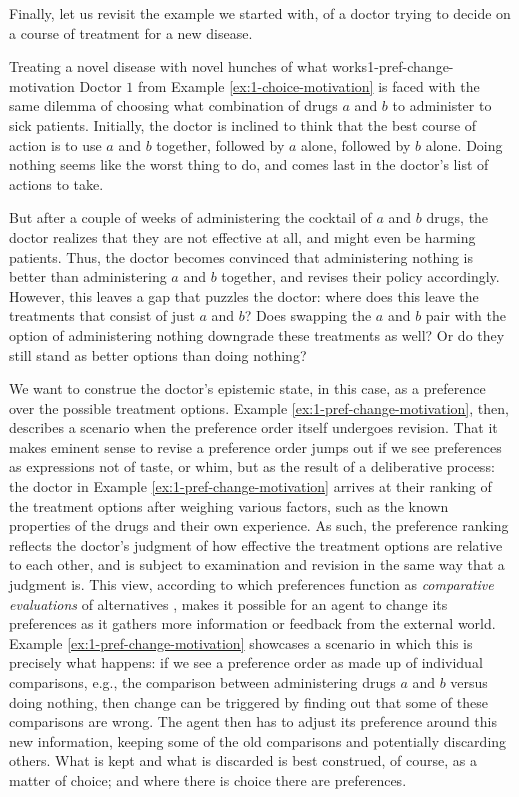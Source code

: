 Finally, let us revisit the example we started with,
of a doctor trying to decide on a course of treatment 
for a new disease.

\begin{xmpl}{Treating a novel disease with novel hunches of what works}{1-pref-change-motivation}
	Doctor $1$ from Example \ref{ex:1-choice-motivation} is faced with the same dilemma
	of choosing what combination of drugs $a$ and $b$
	to administer to sick patients.
	Initially, the doctor is inclined to think that 
	the best course of action is to use $a$ and $b$ together,
	followed by $a$ alone, followed by $b$ alone.
	Doing nothing seems like the worst thing to do,
	and comes last in the doctor's list of actions to take.

	But after a couple of weeks of administering the cocktail of 
	$a$ and $b$ drugs, the doctor realizes that they are not
	effective at all, and might even be harming patients.
	Thus, the doctor becomes convinced that administering nothing
	is better than administering $a$ and $b$ together, and 
	revises their policy accordingly.
	However, this leaves a gap that puzzles the doctor:
	where does this leave the treatments that consist of 
	just $a$ and $b$? Does swapping the $a$ and $b$ pair 
	with the option of administering nothing downgrade 
	these treatments as well? Or do they still stand 
	as better options than doing nothing?
\end{xmpl}

We want to construe the doctor's epistemic state, in this case,
as a preference over the possible treatment options. 
Example \ref{ex:1-pref-change-motivation}, then,
describes a scenario when the preference order itself undergoes 
revision. That it makes eminent sense to revise a preference order
jumps out if we see preferences as expressions not of taste, or whim,
but as the result of a deliberative process: the doctor 
in Example \ref{ex:1-pref-change-motivation} arrives at their ranking 
of the treatment options after weighing various factors,
such as the known properties of the drugs and their own experience.
As such, the preference ranking reflects the doctor's judgment of 
how effective the treatment options are relative to each other,
and is subject to examination and revision in the same way that 
a judgment is. This view, according to which preferences function 
as \emph{comparative evaluations} of alternatives \cite{Hausman11},
makes it possible for an agent to change its preferences as it
gathers more information or feedback from the external world.
Example \ref{ex:1-pref-change-motivation} showcases a scenario in 
which this is precisely what happens: if we see a preference order
as made up of individual comparisons, 
e.g., the comparison between administering drugs $a$ and $b$ versus 
doing nothing,
then change can be triggered
by finding out that some of these comparisons are wrong.
The agent then has to adjust its preference around this
new information, keeping some of the old comparisons and
potentially discarding others.
What is kept and what is discarded is best construed, 
of course, as a matter of choice; and where there is 
choice there are preferences.

